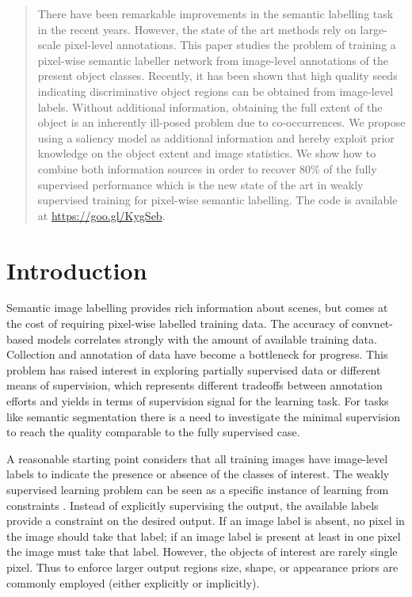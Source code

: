 \documentclass[british,10pt,twocolumn,letterpaper]{article}
\begin{document}
\begin{abstract}
There have been remarkable improvements in the semantic labelling
task in the recent years. However, the state of the art methods rely
on large-scale pixel-level annotations. This paper studies the problem
of training a pixel-wise semantic labeller network from image-level
annotations of the present object classes. Recently, it has been shown
that high quality seeds indicating discriminative object regions can
be obtained from image-level labels. Without additional information,
obtaining the full extent of the object is an inherently ill-posed
problem due to co-occurrences. We propose using a saliency model as
additional information and hereby exploit prior knowledge on the
object extent and image statistics. We show how to combine both information
sources in order to recover $80\%$ of the fully supervised performance
\textendash{} which is the new state of the art in weakly supervised
training for pixel-wise semantic labelling. The code is available at \url{https://goo.gl/KygSeb}.


\end{abstract}

\section{\label{sec:Introduction}Introduction}


\noindent Semantic image labelling provides rich information about
scenes, but comes at the cost of requiring pixel-wise labelled training
data. The accuracy of convnet-based models correlates strongly with
the amount of available training data. Collection and annotation of
data have become a bottleneck for progress. This problem has raised
interest in exploring partially supervised data or different means
of supervision, which represents different tradeoffs between annotation
efforts and yields in terms of supervision signal for the learning
task. For tasks like semantic segmentation there is a need to investigate
the minimal supervision to reach the quality comparable to the fully
supervised case.

A reasonable starting point considers that all training images have
image-level labels to indicate the presence or absence of the classes
of interest. The weakly supervised learning problem can be seen as
a specific instance of learning from constraints \cite{Shcherbatyi2016Gcpr,Xu2015CvprWeakSegmentation}.
Instead of explicitly supervising the output, the available labels
provide a constraint on the desired output. If an image label is absent,
no pixel in the image should take that label; if an image label is
present at least in one pixel the image must take that label. However,
the objects of interest are rarely single pixel. Thus to enforce larger
output regions size, shape, or appearance priors are commonly employed
(either explicitly or implicitly). 
\end{document}
